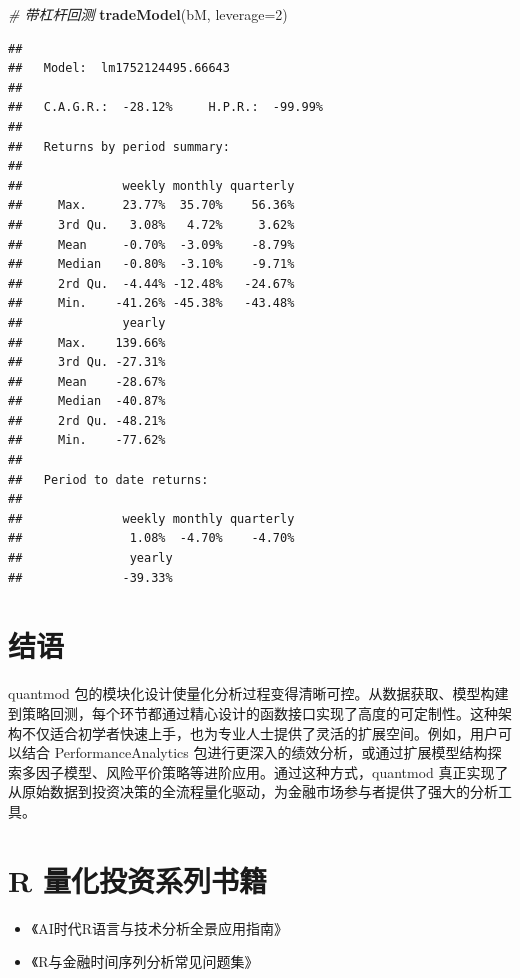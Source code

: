 \documentclass[]{ctexbook}
\newenvironment{Shaded}{\begin{snugshade}}{\end{snugshade}}
\newcommand{\AttributeTok}[1]{\textcolor[rgb]{0.13,0.29,0.53}{#1}}
\newcommand{\CommentTok}[1]{\textcolor[rgb]{0.56,0.35,0.01}{\textit{#1}}}
\newcommand{\DecValTok}[1]{\textcolor[rgb]{0.00,0.00,0.81}{#1}}
\newcommand{\FunctionTok}[1]{\textcolor[rgb]{0.13,0.29,0.53}{\textbf{#1}}}
\newcommand{\NormalTok}[1]{#1}
\providecommand{\tightlist}{%
  \setlength{\itemsep}{0pt}\setlength{\parskip}{0pt}}
\begin{document}
\begin{Shaded}
\begin{Highlighting}[]
\CommentTok{\# 带杠杆回测}
\FunctionTok{tradeModel}\NormalTok{(bM, }\AttributeTok{leverage=}\DecValTok{2}\NormalTok{)}
\end{Highlighting}
\end{Shaded}

\begin{verbatim}
## 
##   Model:  lm1752124495.66643 
## 
##   C.A.G.R.:  -28.12%     H.P.R.:  -99.99% 
## 
##   Returns by period summary:
## 
##              weekly monthly quarterly
##     Max.     23.77%  35.70%    56.36%
##     3rd Qu.   3.08%   4.72%     3.62%
##     Mean     -0.70%  -3.09%    -8.79%
##     Median   -0.80%  -3.10%    -9.71%
##     2rd Qu.  -4.44% -12.48%   -24.67%
##     Min.    -41.26% -45.38%   -43.48%
##              yearly
##     Max.    139.66%
##     3rd Qu. -27.31%
##     Mean    -28.67%
##     Median  -40.87%
##     2rd Qu. -48.21%
##     Min.    -77.62%
## 
##   Period to date returns:
## 
##              weekly monthly quarterly
##               1.08%  -4.70%    -4.70%
##               yearly
##              -39.33%
\end{verbatim}

\chapter*{结语}\label{conclusion}


quantmod 包的模块化设计使量化分析过程变得清晰可控。从数据获取、模型构建到策略回测，每个环节都通过精心设计的函数接口实现了高度的可定制性。这种架构不仅适合初学者快速上手，也为专业人士提供了灵活的扩展空间。例如，用户可以结合 PerformanceAnalytics 包进行更深入的绩效分析，或通过扩展模型结构探索多因子模型、风险平价策略等进阶应用。通过这种方式，quantmod 真正实现了从原始数据到投资决策的全流程量化驱动，为金融市场参与者提供了强大的分析工具。

\cleardoublepage

\appendix {}


\chapter{R 量化投资系列书籍}\label{quantbooks}

\begin{itemize}
\tightlist
\item
  《AI时代R语言与技术分析全景应用指南》
\item
  《R与金融时间序列分析常见问题集》
\end{itemize}
\end{document}

